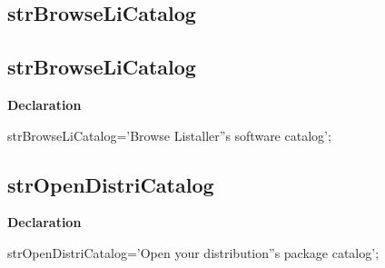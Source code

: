 \documentclass{report}
\newif\ifpdf
\begin{document}
\subsection*{\large{\textbf{strBrowseLiCatalog}}\normalsize\hspace{1ex}\hrulefill}
\else
\subsection*{strBrowseLiCatalog}
\fi
\label{trstrings-strBrowseLiCatalog}
\begin{list}{}{
\setlength{\itemindent}{0cm}
\setlength{\listparindent}{0cm}
\setlength{\leftmargin}{\evensidemargin}
\addtolength{\leftmargin}{\tmplength}
\settowidth{\labelsep}{X}
\addtolength{\leftmargin}{\labelsep}
\setlength{\labelwidth}{\tmplength}
}
\item[\textbf{Declaration}\hfill]
\ifpdf
\begin{flushleft}
\fi
\begin{ttfamily}
strBrowseLiCatalog='Browse Listaller''s software catalog';\end{ttfamily}

\ifpdf
\end{flushleft}
\fi

\end{list}
\ifpdf
\subsection*{\large{\textbf{strOpenDistriCatalog}}\normalsize\hspace{1ex}\hrulefill}
\else
\subsection*{strOpenDistriCatalog}
\fi
\label{trstrings-strOpenDistriCatalog}
\begin{list}{}{
\setlength{\itemindent}{0cm}
\setlength{\listparindent}{0cm}
\setlength{\leftmargin}{\evensidemargin}
\addtolength{\leftmargin}{\tmplength}
\settowidth{\labelsep}{X}
\addtolength{\leftmargin}{\labelsep}
\setlength{\labelwidth}{\tmplength}
}
\item[\textbf{Declaration}\hfill]
\ifpdf
\begin{flushleft}
\fi
\begin{ttfamily}
strOpenDistriCatalog='Open your distribution''s package catalog';\end{ttfamily}

\ifpdf
\end{flushleft}
\fi

\end{list}
\ifpdf
\end{document}
